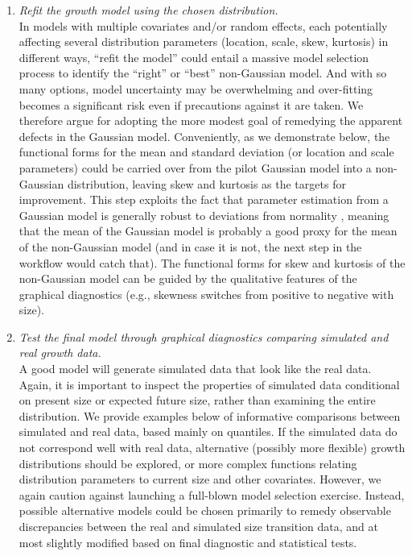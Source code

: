 \documentclass[12pt]{article}
\begin{document}
\begin{enumerate}[label=\arabic*., listparindent=1.5em]
\item \textit{Refit the growth model using the chosen distribution.}
\\
In models with multiple covariates and/or random effects, each potentially affecting several distribution parameters (location, scale, skew, kurtosis) in
different ways, ``refit the model'' could entail a massive model selection process to identify the ``right'' or ``best'' non-Gaussian model. 
And with so many options, model uncertainty may be overwhelming and over-fitting becomes a significant risk even if precautions against it are taken. 
We therefore argue for adopting the more modest goal of remedying the apparent defects in the Gaussian model. 
Conveniently, as we demonstrate below, the functional forms for the mean and standard deviation (or location and scale parameters) could be carried over from the pilot Gaussian model into a non-Gaussian distribution, leaving skew and kurtosis as the targets for improvement. 
This step exploits the fact that parameter estimation from a Gaussian model is generally robust to deviations from normality \citep{schielzeth2020robustness}, meaning that the mean of the Gaussian model is probably a good proxy for the mean of the non-Gaussian model (and in case it is not, the next step in the workflow would catch that). 
The functional forms for skew and kurtosis of the non-Gaussian model can be guided by the qualitative features of the graphical diagnostics (e.g., skewness switches from positive to negative with size). 

\item \textit{Test the final model through graphical diagnostics comparing simulated and real growth data.} 
\\
A good model will generate simulated data that look like the real data.  
Again, it is important to inspect the properties of simulated data conditional on present size or expected future size, rather than examining the entire distribution.   
We provide examples below of informative comparisons between simulated and real data, based mainly on quantiles. 
If the simulated data do not correspond well with real data, alternative (possibly more flexible) growth distributions should be explored, or more complex
functions relating distribution parameters to current size and other covariates. 
However, we again caution against launching a full-blown model selection exercise. 
Instead, possible alternative models could be chosen primarily to remedy observable discrepancies between the real and simulated size transition data, and at most slightly modified based on final diagnostic and statistical tests.

\end{enumerate}
\end{document}
